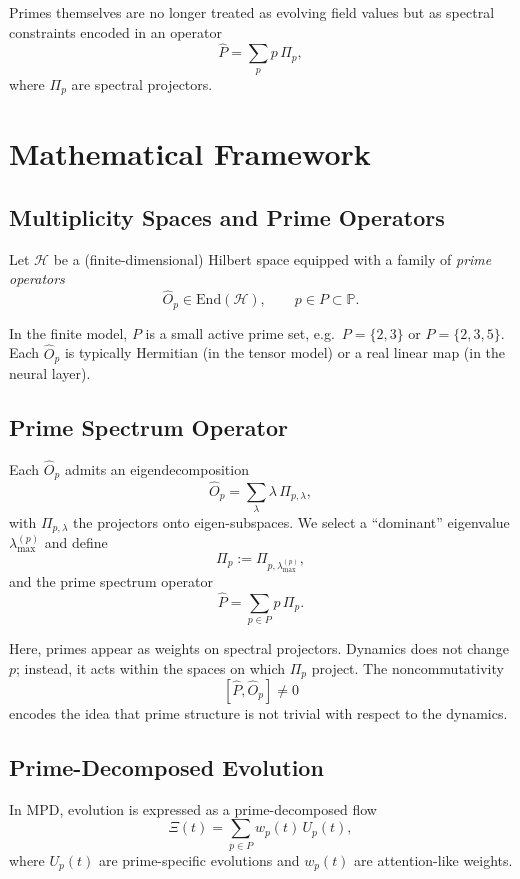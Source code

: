 \documentclass[11pt]{article}
\begin{document}
Primes themselves are no longer treated as evolving field values but as spectral constraints encoded in an operator
\[
\hat{P} = \sum_p p\,\Pi_p,
\]
where $\Pi_p$ are spectral projectors.

\section{Mathematical Framework}

\subsection{Multiplicity Spaces and Prime Operators}

Let $\mathcal{H}$ be a (finite-dimensional) Hilbert space equipped with a family of \emph{prime operators}
\[
\hat{O}_p \in \mathrm{End}(\mathcal{H}),\qquad p \in P \subset \mathbb{P}.
\]

In the finite model, $P$ is a small active prime set, e.g.\ $P = \{ 2,3\}$ or $P = \{2,3,5\}$. Each $\hat{O}_p$ is typically Hermitian (in the tensor model) or a real linear map (in the neural layer).

\subsection{Prime Spectrum Operator}

Each $\hat{O}_p$ admits an eigendecomposition
\[
\hat{O}_p = \sum_{\lambda} \lambda \,\Pi_{p,\lambda},
\]
with $\Pi_{p,\lambda}$ the projectors onto eigen-subspaces. We select a ``dominant'' eigenvalue $\lambda_{\max}^{(p)}$ and define
\[
\Pi_p := \Pi_{p,\lambda_{\max}^{(p)}},
\]
and the prime spectrum operator
\[
\hat{P} = \sum_{p\in P} p\, \Pi_p.
\]

Here, primes appear as weights on spectral projectors. Dynamics does not change $p$; instead, it acts within the spaces on which $\Pi_p$ project. The noncommutativity
\[
[\hat{P}, \hat{O}_p] \neq 0
\]
encodes the idea that prime structure is not trivial with respect to the dynamics.

\subsection{Prime-Decomposed Evolution}

In MPD, evolution is expressed as a prime-decomposed flow
\[
\Xi(t) = \sum_{p\in P} w_p(t)\,U_p(t),
\]
where $U_p(t)$ are prime-specific evolutions and $w_p(t)$ are attention-like weights.
\end{document}
